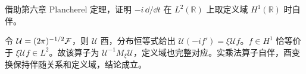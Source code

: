 \begin{exercise}[实轴动量算子]\label{ex:y7-momentum}
借助第六章 Plancherel 定理，证明 $-i\,\dd/\dd t$ 在 $L^2(\mathbb R)$ 上取定义域 $H^1(\mathbb R)$ 时自伴。
\end{exercise}
\begin{solution}
令 $\mathcal U=(2\pi)^{-1/2}\mathcal{F}$，则 $\mathcal U$ 酉，分布恒等式给出 $\mathcal U(-if')=\xi\mathcal Uf$。$f\in H^1$ 恰等价于 $\xi\mathcal Uf\in L^2$。故该算子为 $\mathcal U^{-1}M_\xi\mathcal U$，定义域也完整对应。实乘法算子自伴，酉变换保持伴随关系和定义域，结论成立。
\end{solution}
